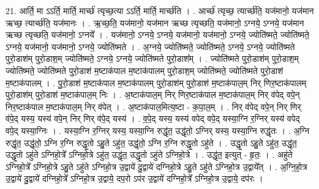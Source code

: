 \documentclass[17pt]{extarticle}
\begin{document}
21. आर्ति॒ मा ऽऽर्ति॒ मार्ति॒ मार्च्छ॑ त्यृच्छ॒त्या ऽऽर्ति॒ मार्ति॒ मार्च्छ॑ति । . आर्च्छ॑ त्यृच्छ॒ त्यार्च्छ॑ति॒ यज॑मानो॒ यज॑मान ऋच्छ॒ त्यार्च्छ॑ति॒ यज॑मानः । . ऋ॒च्छ॒ति॒ यज॑मानो॒ यज॑मान ऋच्छ त्यृच्छति॒ यज॑मानो॒ ऽग्नये॒ ऽग्नये॒ यज॑मान ऋच्छ त्यृच्छति॒ यज॑मानो॒ ऽग्नये᳚ । . यज॑मानो॒ ऽग्नये॒ ऽग्नये॒ यज॑मानो॒ यज॑मानो॒ ऽग्नये॒ ज्योति॑ष्मते॒ ज्योति॑ष्मते॒ ऽग्नये॒ यज॑मानो॒ यज॑मानो॒ ऽग्नये॒ ज्योति॑ष्मते । . अ॒ग्नये॒ ज्योति॑ष्मते॒ ज्योति॑ष्मते॒ ऽग्नये॒ ऽग्नये॒ ज्योति॑ष्मते पुरो॒डाश॑म् पुरो॒डाश॒म् ज्योति॑ष्मते॒ ऽग्नये॒ ऽग्नये॒ ज्योति॑ष्मते पुरो॒डाश᳚म् । . ज्योति॑ष्मते पुरो॒डाश॑म् पुरो॒डाश॒म् ज्योति॑ष्मते॒ ज्योति॑ष्मते पुरो॒डाश॑ म॒ष्टाक॑पाल म॒ष्टाक॑पालम् पुरो॒डाश॒म् ज्योति॑ष्मते॒ ज्योति॑ष्मते पुरो॒डाश॑ म॒ष्टाक॑पालम् । . पु॒रो॒डाश॑ म॒ष्टाक॑पाल म॒ष्टाक॑पालम् पुरो॒डाश॑म् पुरो॒डाश॑ म॒ष्टाक॑पाल॒म् निर् णिर॒ष्टाक॑पालम् पुरो॒डाश॑म् पुरो॒डाश॑ म॒ष्टाक॑पाल॒म् निः । . अ॒ष्टाक॑पाल॒म् निर् णिर॒ष्टाक॑पाल म॒ष्टाक॑पाल॒म् निर् व॑पेद् वपे॒न् निर॒ष्टाक॑पाल म॒ष्टाक॑पाल॒म् निर् व॑पेत् । . अ॒ष्टाक॑पाल॒मित्य॒ष्टा - क॒पा॒ल॒म् । . निर् व॑पेद् वपे॒न् निर् णिर् व॑पे॒द् यस्य॒ यस्य॑ वपे॒न् निर् णिर् व॑पे॒द् यस्य॑ । . व॒पे॒द् यस्य॒ यस्य॑ वपेद् वपे॒द् यस्या॒ग्नि र॒ग्निर् यस्य॑ वपेद् वपे॒द् यस्या॒ग्निः । . यस्या॒ग्नि र॒ग्निर् यस्य॒ यस्या॒ग्नि रुद्धृ॑त॒ उद्धृ॑तो॒ ऽग्निर् यस्य॒ यस्या॒ग्नि रुद्धृ॑तः । . अ॒ग्नि रुद्धृ॑त॒ उद्धृ॑तो॒ ऽग्नि र॒ग्नि रुद्धृ॒तो ऽहु॒ते ऽहु॑त॒ उद्धृ॑तो॒ ऽग्नि र॒ग्नि रुद्धृ॒तो ऽहु॑ते । . उद्धृ॒तो ऽहु॒ते ऽहु॑त॒ उद्धृ॑त॒ उद्धृ॒तो ऽहु॑ते ऽग्निहो॒त्रे᳚ ऽग्निहो॒त्रे ऽहु॑त॒ उद्धृ॑त॒ उद्धृ॒तो ऽहु॑ते ऽग्निहो॒त्रे । . उद्धृ॑त॒ इत्युत् - हृ॒तः॒ । . अहु॑ते ऽग्निहो॒त्रे᳚ ऽग्निहो॒त्रे ऽहु॒ते ऽहु॑ते ऽग्निहो॒त्र उ॒द्वाये॑ दु॒द्वाये॑ दग्निहो॒त्रे ऽहु॒ते ऽहु॑ते ऽग्निहो॒त्र उ॒द्वाये᳚त् । . अ॒ग्नि॒हो॒त्र उ॒द्वाये॑ दु॒द्वाये॑ दग्निहो॒त्रे᳚ ऽग्निहो॒त्र उ॒द्वाये॒ दप॒रो ऽप॑र उ॒द्वाये॑ दग्निहो॒त्रे᳚ ऽग्निहो॒त्र उ॒द्वाये॒ दप॑रः । \newline
\end{document}

